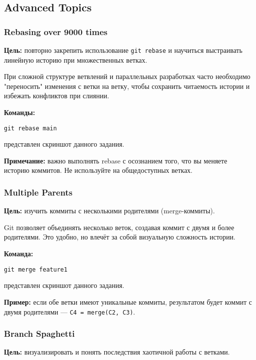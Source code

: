 \documentclass[a4paper,12pt]{report}
\begin{document}
\subsection{Advanced Topics}

\subsubsection{Rebasing over 9000 times}
\textbf{Цель:} повторно закрепить использование \texttt{git rebase} и научиться выстраивать линейную историю при множественных ветках.

При сложной структуре ветвлений и параллельных разработках часто необходимо "переносить" изменения с ветки на ветку, чтобы сохранить читаемость истории и избежать конфликтов при слиянии.

\textbf{Команды:}
\begin{verbatim}
git rebase main
\end{verbatim}

 представлен скриншот данного задания.

\textbf{Примечание:} важно выполнять rebase с осознанием того, что вы меняете историю коммитов. Не используйте на общедоступных ветках.

\subsubsection{Multiple Parents}
\textbf{Цель:} изучить коммиты с несколькими родителями (merge-коммиты).

Git позволяет объединять несколько веток, создавая коммит с двумя и более родителями. Это удобно, но влечёт за собой визуальную сложность истории.

\textbf{Команда:}
\begin{verbatim}
git merge feature1
\end{verbatim}

 представлен скриншот данного задания.

\textbf{Пример:} если обе ветки имеют уникальные коммиты, результатом будет коммит с двумя родителями — \texttt{C4 = merge(C2, C3)}.

\subsubsection{Branch Spaghetti}
\textbf{Цель:} визуализировать и понять последствия хаотичной работы с ветками.
\end{document}

